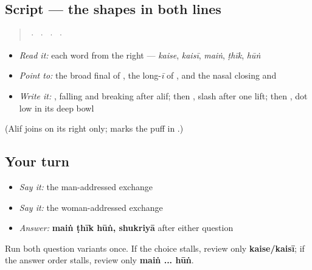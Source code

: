 \subsection*{Script — the shapes in both lines}
\begin{quote}
 ·  ·  ·  · 
\end{quote}

\begin{itemize}
\raggedright
  \item \emph{Read it:} each word from the right — \emph{kaise}, \emph{kaisī}, \emph{maiṅ}, \emph{ṭhīk}, \emph{hūṅ}
  \item \emph{Point to:} the broad final \textbf{} of \textbf{}, the long-\emph{ī} \textbf{} of \textbf{}, and the nasal \textbf{} closing \textbf{} and \textbf{}
  \item \emph{Write it:} \textbf{}, falling and breaking after alif; then \textbf{}, slash after one lift; then \textbf{}, dot low in its deep bowl
\end{itemize}

(Alif joins on its right only; \textbf{} marks the puff in \textbf{}.)

\subsection*{Your turn}
\begin{itemize}
\raggedright
  \item \emph{Say it:} the man-addressed exchange
  \item \emph{Say it:} the woman-addressed exchange
  \item \emph{Answer:} \textbf{maiṅ ṭhīk hūṅ, shukriyā} after either question
\end{itemize}

\begin{tcolorbox}[breakable,colback=teal!4,colframe=teal!35!black,title={Before you move on}]
Run both question variants once. If the choice stalls, review only \textbf{kaise/kaisī}; if the answer order stalls, review only \textbf{maiṅ ... hūṅ}.
\end{tcolorbox}
